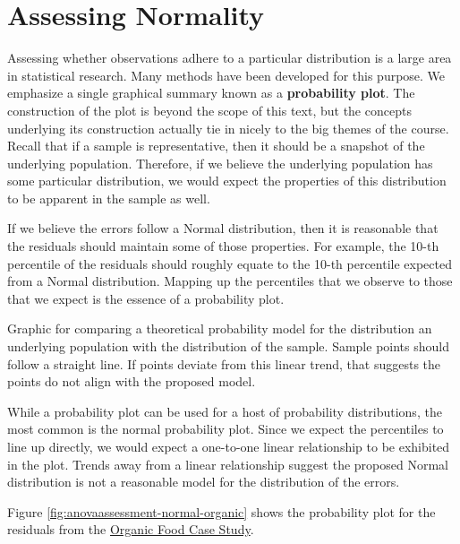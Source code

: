 \documentclass[]{book}
\theoremstyle{definition}
\theoremstyle{definition}
\theoremstyle{definition}
\theoremstyle{remark}
\let\BeginKnitrBlock\begin \let\EndKnitrBlock\end
\begin{document}
\section{Assessing Normality}\label{assessing-normality}

Assessing whether observations adhere to a particular distribution is a
large area in statistical research. Many methods have been developed for
this purpose. We emphasize a single graphical summary known as a
\textbf{probability plot}. The construction of the plot is beyond the
scope of this text, but the concepts underlying its construction
actually tie in nicely to the big themes of the course. Recall that if a
sample is representative, then it should be a snapshot of the underlying
population. Therefore, if we believe the underlying population has some
particular distribution, we would expect the properties of this
distribution to be apparent in the sample as well.

If we believe the errors follow a Normal distribution, then it is
reasonable that the residuals should maintain some of those properties.
For example, the 10-th percentile of the residuals should roughly equate
to the 10-th percentile expected from a Normal distribution. Mapping up
the percentiles that we observe to those that we expect is the essence
of a probability plot.

\BeginKnitrBlock{definition}[Probability Plot]
\protect\hypertarget{def:defn-probability-plot}{}{\label{def:defn-probability-plot}
{} }Graphic for comparing a theoretical
probability model for the distribution an underlying population with the
distribution of the sample. Sample points should follow a straight line.
If points deviate from this linear trend, that suggests the points do
not align with the proposed model.
\EndKnitrBlock{definition}

While a probability plot can be used for a host of probability
distributions, the most common is the normal probability plot. Since we
expect the percentiles to line up directly, we would expect a one-to-one
linear relationship to be exhibited in the plot. Trends away from a
linear relationship suggest the proposed Normal distribution is not a
reasonable model for the distribution of the errors.

Figure \ref{fig:anovaassessment-normal-organic} shows the probability
plot for the residuals from the \protect\hyperlink{CaseOrganic}{Organic
Food Case Study}.
\end{document}
